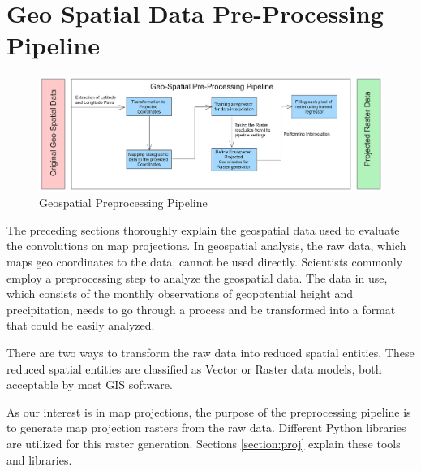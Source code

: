 
\clearpage
\cleardoublepage

\chapter{Geo Spatial Data Pre-Processing Pipeline}
\label{chap:preprocess}
\begin{figure}[h]
    \centering
    \includegraphics[width=1.0\linewidth]{figures/chapter-7/pipeline.png}
    \caption{Geospatial Preprocessing Pipeline}
    \label{fig:preprocessingpipeline}
\end{figure}
The preceding sections thoroughly explain the geospatial data used to evaluate the convolutions on map projections. In geospatial analysis, the raw data, which maps geo coordinates to the data, cannot be used directly. Scientists commonly employ a preprocessing step to analyze the geospatial data. The data in use, which consists of the monthly observations of geopotential height and precipitation, needs to go through a process and be transformed into a format that could be easily analyzed.

There are two ways to transform the raw data into reduced spatial entities. These reduced spatial entities are classified as Vector or Raster data models, both acceptable by most GIS software.

As our interest is in map projections, the purpose of the preprocessing pipeline is to generate map projection rasters from the raw data. Different Python libraries are utilized for this raster generation.
Sections \autoref{section:proj} explain these tools and libraries.

